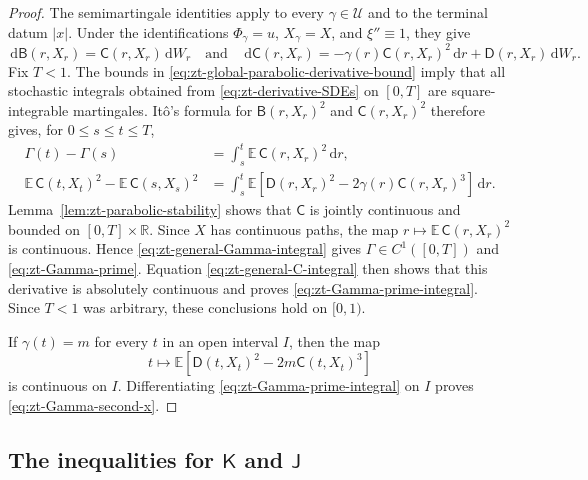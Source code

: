 \documentclass[10pt]{amsart}
\theoremstyle{definition}
\theoremstyle{remark}
\numberwithin{equation}{section}
\newcommand{\R}{\mathbb R}
\newcommand{\E}{\mathbb E}
\newcommand{\1}{\mathbf 1}
\newcommand{\cU}{\mathcal U}
\newcommand{\dd}{\,\mathrm d}
\begin{document}
\begin{proof}
The semimartingale identities \cite[Lemma~3, equations~(14)--(15)]{ChenHandschyLerman} apply to every $\gamma\in\cU$ and to the terminal datum $|x|$. Under the identifications $\Phi_\gamma=u$, $X_\gamma=X$, and $\xi''\equiv1$, they give
\begin{equation}
 \dd\mathsf B(r,X_r)=\mathsf C(r,X_r)\dd W_r
 \quad\text{and}\quad
 \dd\mathsf C(r,X_r)
 =-\gamma(r)\mathsf C(r,X_r)^2\dd r
 +\mathsf D(r,X_r)\dd W_r.                                      \label{eq:zt-derivative-SDEs}
\end{equation}
Fix $T<1$. The bounds in \eqref{eq:zt-global-parabolic-derivative-bound} imply that all stochastic integrals obtained from \eqref{eq:zt-derivative-SDEs} on $[0,T]$ are square-integrable martingales. It\^o's formula for $\mathsf B(r,X_r)^2$ and $\mathsf C(r,X_r)^2$ therefore gives, for $0\leq s\leq t\leq T$,
\begin{align}
 \Gamma(t)-\Gamma(s)
 &=\int_s^t\E\,\mathsf C(r,X_r)^2\dd r,                               \label{eq:zt-general-Gamma-integral}\\
 \E\,\mathsf C(t,X_t)^2-\E\,\mathsf C(s,X_s)^2
 &=\int_s^t\E\left[\mathsf D(r,X_r)^2
       -2\gamma(r)\mathsf C(r,X_r)^3\right]\dd r.                   \label{eq:zt-general-C-integral}
\end{align}
Lemma~\ref{lem:zt-parabolic-stability} shows that $\mathsf C$ is jointly continuous and bounded on $[0,T]\times\R$. Since $X$ has continuous paths, the map $r\mapsto\E\,\mathsf C(r,X_r)^2$ is continuous. Hence \eqref{eq:zt-general-Gamma-integral} gives $\Gamma\in C^1([0,T])$ and \eqref{eq:zt-Gamma-prime}. Equation \eqref{eq:zt-general-C-integral} then shows that this derivative is absolutely continuous and proves \eqref{eq:zt-Gamma-prime-integral}. Since $T<1$ was arbitrary, these conclusions hold on $[0,1)$.

If $\gamma(t)=m$ for every $t$ in an open interval $I$, then the map
\begin{equation*}
 t\longmapsto\E\left[\mathsf D(t,X_t)^2-2m\mathsf C(t,X_t)^3\right]
\end{equation*}
is continuous on $I$. Differentiating \eqref{eq:zt-Gamma-prime-integral} on $I$ proves \eqref{eq:zt-Gamma-second-x}.
\end{proof}

\subsection{\texorpdfstring{The inequalities for $\mathsf K$ and $\mathsf J$}{The inequalities for K and J}}
\label{sec:zt-KJ}
\end{document}
